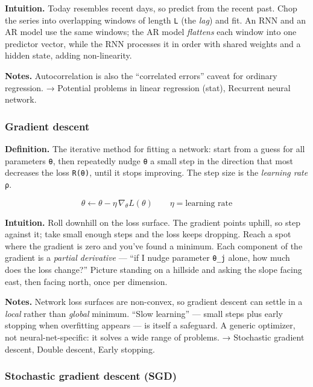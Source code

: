 \documentclass[
  10pt,
  letterpaper,
  onecolumn]{article}
\begin{document}
\textbf{Intuition.} Today resembles recent days, so predict from the
recent past. Chop the series into overlapping windows of length
\texttt{L} (the \emph{lag}) and fit. An RNN and an AR model use the same
windows; the AR model \emph{flattens} each window into one predictor
vector, while the RNN processes it in order with shared weights and a
hidden state, adding non-linearity.

\textbf{Notes.} Autocorrelation is also the ``correlated errors'' caveat
for ordinary regression. → Potential problems in linear regression
(stat), Recurrent neural network.

\hypertarget{gradient-descent}{%
\subsubsection{Gradient descent}\label{gradient-descent}}

\textbf{Definition.} The iterative method for fitting a network: start
from a guess for all parameters \texttt{θ}, then repeatedly nudge
\texttt{θ} a small step in the direction that most decreases the loss
\texttt{R(θ)}, until it stops improving. The step size is the
\emph{learning rate} \texttt{ρ}.

\begin{equation*}
\theta\leftarrow\theta-\eta\,\nabla_\theta L(\theta)
\qquad \eta=\text{learning rate}
\end{equation*}

\textbf{Intuition.} Roll downhill on the loss surface. The gradient
points uphill, so step against it; take small enough steps and the loss
keeps dropping. Reach a spot where the gradient is zero and you've found
a minimum. Each component of the gradient is a \emph{partial derivative}
--- ``if I nudge parameter \texttt{θ\_j} alone, how much does the loss
change?'' Picture standing on a hillside and asking the slope facing
east, then facing north, once per dimension.

\textbf{Notes.} Network loss surfaces are non-convex, so gradient
descent can settle in a \emph{local} rather than \emph{global} minimum.
``Slow learning'' --- small steps plus early stopping when overfitting
appears --- is itself a safeguard. A generic optimizer, not
neural-net-specific: it solves a wide range of problems. → Stochastic
gradient descent, Double descent, Early stopping.

\hypertarget{stochastic-gradient-descent-sgd}{%
\subsubsection{Stochastic gradient descent
(SGD)}\label{stochastic-gradient-descent-sgd}}
\end{document}
